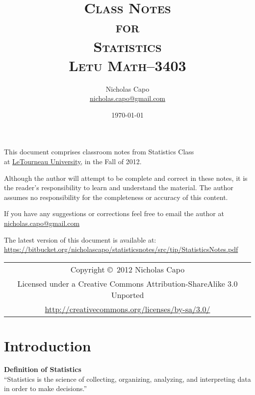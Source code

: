 \documentclass{book}
\title{\textsc{Class Notes\\ for \\ Statistics\\ Letu Math--3403}}
\author{Nicholas Capo\\ \href{mailto:nicholas.capo@gmail.com}{nicholas.capo@gmail.com}}
\date{\today\\ \currenttime}
\begin{document}
\maketitle

\section*{}
\begin{center}
This document comprises classroom notes from Statistics Class\\ at \href{letu.edu}{LeTourneau University}, in the Fall of 2012.

\vspace{10pt}

Although the author will attempt to be complete and correct in these notes, it is the reader's responsibility to learn and understand the material. The author assumes no responsibility for the completeness or accuracy of this content. 

\vspace{10pt}

If you have any suggestions  or corrections feel free to email the author at \href{mailto:nicholas.capo@gmail.com}{nicholas.capo@gmail.com}

\vspace{10pt}

The latest version of this document is available at:\\ \url{https://bitbucket.org/nicholascapo/statisticsnotes/src/tip/StatisticsNotes.pdf}
\end{center}

\vfill
\begin{tabular}{c}
Copyright \copyright\ 2012 Nicholas Capo\\
Licensed under a {Creative Commons Attribution-ShareAlike 3.0 Unported}\\
\url{http://creativecommons.org/licenses/by-sa/3.0/}\\
\end{tabular}

\tableofcontents

\chapter{Introduction}
\begin{center}
\textbf{Definition of Statistics}\\
\enquote{Statistics is the science of collecting, organizing, analyzing, and interpreting data in order to make decisions.}
\end{center}
\end{document}
